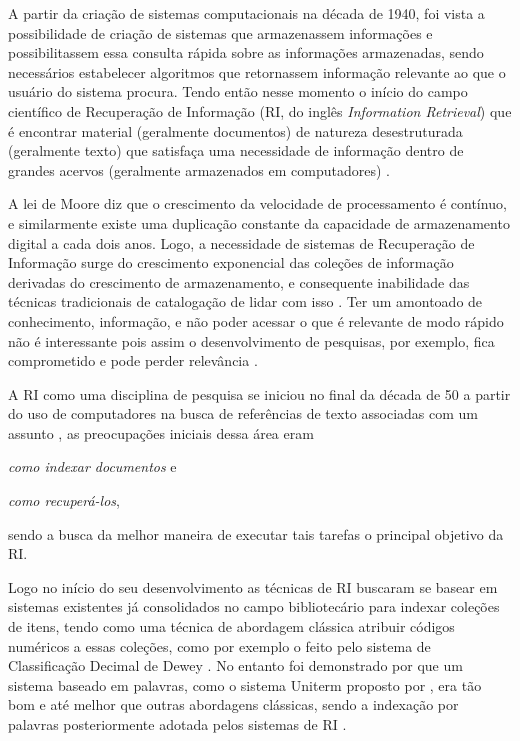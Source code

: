
A partir da criação de sistemas computacionais na década de 1940, foi vista a possibilidade de criação de sistemas que armazenassem informações e possibilitassem essa consulta rápida sobre as informações armazenadas, sendo necessários estabelecer algoritmos que retornassem informação relevante ao que o usuário do sistema procura. 
Tendo então nesse momento o início do campo científico de Recuperação de Informação (RI, do inglês \textit{Information Retrieval}) que é encontrar material (geralmente documentos) de natureza desestruturada (geralmente texto) que satisfaça uma necessidade de informação dentro de grandes acervos (geralmente armazenados em computadores) \cite[p.~1]{Manning2008IIR}.

A lei de Moore diz que o crescimento da velocidade de processamento é contínuo, e similarmente existe uma duplicação constante da capacidade de armazenamento digital a cada dois anos. %
Logo, a necessidade de sistemas de Recuperação de Informação surge do crescimento exponencial das coleções de informação derivadas do crescimento de armazenamento, e consequente inabilidade das técnicas tradicionais de catalogação de lidar com isso \cite{Sanderson2012THIRR}.
Ter um amontoado de conhecimento, informação, e não poder acessar o que é relevante de modo rápido não é interessante pois assim o desenvolvimento de pesquisas, por exemplo, fica comprometido e pode perder relevância \cite{Bush:1979:WMT:1113634.1113638}.

A RI como uma disciplina de pesquisa se iniciou no final da década de 50 a partir do uso de computadores na busca de referências de texto associadas com um assunto \cite[p.~3]{Sanderson2012THIRR}, as preocupações iniciais dessa área eram 
\begin{enumerate*}[label=(\alph*)]
\item \textit{como indexar documentos} e \item \textit{como recuperá-los},
\end{enumerate*}
sendo a busca da melhor maneira de executar tais tarefas o principal objetivo da RI.

Logo no início do seu desenvolvimento as técnicas de RI buscaram se basear em sistemas existentes já consolidados no campo bibliotecário para indexar coleções de itens, tendo como uma técnica de abordagem clássica atribuir códigos numéricos a essas coleções, como por exemplo o feito pelo sistema de Classificação Decimal de Dewey \cite[p.~1446]{Sanderson2012THIRR}.
No entanto foi demonstrado por  que um sistema baseado em palavras, como o sistema Uniterm proposto por , era tão bom e até melhor que outras abordagens clássicas, sendo a indexação por palavras posteriormente adotada pelos sistemas de RI \cite[p.~1446]{Sanderson2012THIRR}.

